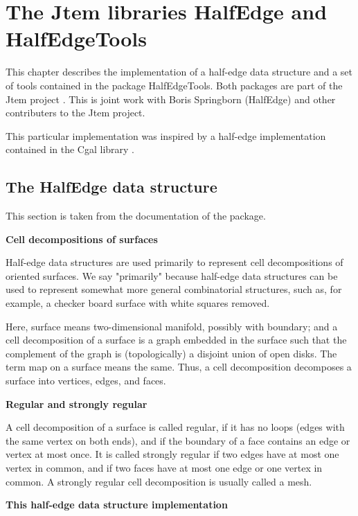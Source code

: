 
\chapter{The {\sc Jtem} libraries {\sc HalfEdge} and {\sc HalfEdgeTools}}

This chapter describes the implementation of a half-edge data structure and a set of tools
contained in the package {\sc HalfEdgeTools}. Both packages are part of the {\sc Jtem} project
\cite{JtemWebsite}. This is joint work with Boris Springborn ({\sc HalfEdge}) and
other contributers to the {\sc Jtem} project.

This particular implementation was inspired by a half-edge implementation contained in
the {\sc Cgal} library \cite{CgalWebsite}.


\label{sec:halfedge_halfedgetools}
\section{The {\sc HalfEdge} data structure}

This section is taken from the documentation of the package.

{\bf Cell decompositions of surfaces}

Half-edge data structures are used primarily to represent cell decompositions of oriented surfaces.
We say "primarily" because half-edge data structures can be used to represent somewhat more general
combinatorial structures, such as, for example, a checker board surface with white squares removed.

Here, surface means two-dimensional manifold, possibly with boundary; and a cell decomposition 
of a surface is a graph embedded in the surface such that the complement of the graph is 
(topologically) a disjoint union of open disks. The term map on a surface means the same. 
Thus, a cell decomposition decomposes a surface into vertices, edges, and faces.

{\bf Regular and strongly regular}

A cell decomposition of a surface is called regular, if it has no loops (edges with the same vertex 
on both ends), and if the boundary of a face contains an edge or vertex at most once. It is called 
strongly regular if two edges have at most one vertex in common, and if two faces have at most 
one edge or one vertex in common. A strongly regular cell decomposition is usually called a mesh.

{\bf This half-edge data structure implementation}

